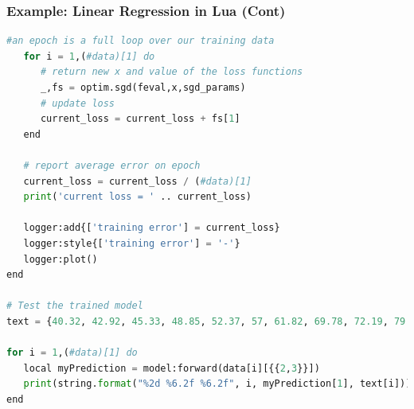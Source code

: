 \begin{frame}[fragile]
\MyLogo
\frametitle{Example: Linear Regression in Lua (Cont)}  
\ContinueLineNumber
\scriptsize{
\begin{lstlisting}[language=python]
   #an epoch is a full loop over our training data
   for i = 1,(#data)[1] do
      # return new x and value of the loss functions
      _,fs = optim.sgd(feval,x,sgd_params)
      # update loss       
      current_loss = current_loss + fs[1]
   end      
   
   # report average error on epoch
   current_loss = current_loss / (#data)[1]
   print('current loss = ' .. current_loss)
   
   logger:add{['training error'] = current_loss}
   logger:style{['training error'] = '-'}
   logger:plot()  
end

# Test the trained model
text = {40.32, 42.92, 45.33, 48.85, 52.37, 57, 61.82, 69.78, 72.19, 79.42}

for i = 1,(#data)[1] do
   local myPrediction = model:forward(data[i][{{2,3}}])
   print(string.format("%2d %6.2f %6.2f", i, myPrediction[1], text[i]))
end
\end{lstlisting}
}

\vskip 50pt
\end{frame}
